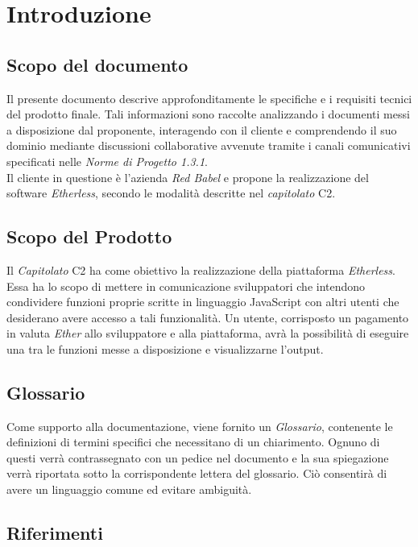 \section{Introduzione}

\subsection{Scopo del documento}
Il presente documento descrive approfonditamente le specifiche e i requisiti tecnici del prodotto finale. Tali informazioni sono raccolte analizzando i documenti messi a disposizione dal proponente, interagendo con il cliente e comprendendo il suo dominio mediante discussioni collaborative avvenute tramite i canali comunicativi specificati nelle \textit{Norme di Progetto 1.3.1}\docs.\\
Il cliente in questione è l'azienda \textit{Red Babel} e propone la realizzazione del software \textit{Etherless}, secondo le modalità descritte nel \textit{capitolato\glo} C2.

\subsection{Scopo del Prodotto}
Il \textit{Capitolato\glo} C2 ha come obiettivo la realizzazione della piattaforma \textit{Etherless}. Essa ha lo scopo di mettere in comunicazione sviluppatori che intendono condividere funzioni proprie scritte in linguaggio JavaScript con altri utenti che desiderano avere accesso a tali funzionalità. Un utente, corrisposto un pagamento in valuta \textit{Ether\glos} allo sviluppatore e alla piattaforma, avrà la possibilità di eseguire una tra le funzioni messe a disposizione e visualizzarne l'output.

\subsection{Glossario}
Come supporto alla documentazione, viene fornito un \textit{Glossario}\docs, contenente le definizioni di termini specifici che necessitano di un chiarimento. Ognuno di questi verr\`a contrassegnato con un pedice \glo nel documento e la sua spiegazione verr\`a riportata sotto la corrispondente lettera del glossario. Ci\`o consentir\`a di avere un linguaggio comune ed evitare ambiguit\`a.
	
\subsection{Riferimenti}

